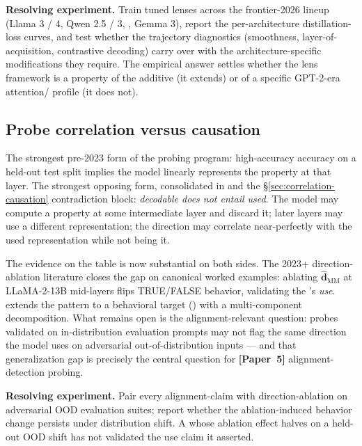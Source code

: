 \textbf{Resolving experiment.} Train tuned lenses across the
frontier-2026 lineup (Llama 3 / 4, Qwen 2.5 / 3, , Gemma 3),
report the per-architecture distillation-loss curves, and test whether
the trajectory diagnostics (smoothness, layer-of-acquisition,
contrastive  decoding) carry over with the architecture-specific
modifications they require. The empirical answer settles whether the
lens framework is a property of the additive  (it
extends) or of a specific GPT-2-era attention/ profile (it does
not).

\subsection{Probe correlation versus causation}
\label{sec:contradictions-probe}

The strongest pre-2023 form of the probing program: high-accuracy
 accuracy on a held-out test split implies the model
linearly represents the property at that layer. The strongest opposing
form, consolidated in
\citet[\S abstract]{belinkov2022-probing-survey} and the
\S\ref{sec:correlation-causation} contradiction block: \emph{decodable
does not entail used}. The model may compute a property at some
intermediate layer and discard it; later layers may use a different
representation; the  direction may correlate near-perfectly with
the used representation while not being it.

The evidence on the table is now substantial on both sides. The 2023+
direction-ablation literature
\citep[\S 3]{marks-tegmark-2023-truth} closes the gap on canonical
worked examples: ablating $\hat{\mathbf{d}}_{\text{MM}}$ at LLaMA-2-13B
mid-layers flips TRUE/FALSE behavior, validating the 's
\emph{use}.  extends the pattern to a behavioral target
() with a multi-component decomposition. What remains open
is the alignment-relevant question: probes validated on
in-distribution evaluation prompts may not flag the same direction the
model uses on adversarial out-of-distribution inputs --- and that
generalization gap is precisely the central question for
\textbf{[Paper~5]} alignment-detection probing.

\textbf{Resolving experiment.} Pair every alignment-claim  with
direction-ablation on adversarial OOD evaluation suites; report
whether the ablation-induced behavior change persists under
distribution shift. A  whose ablation effect halves on a
held-out OOD shift has not validated the use claim it asserted.


